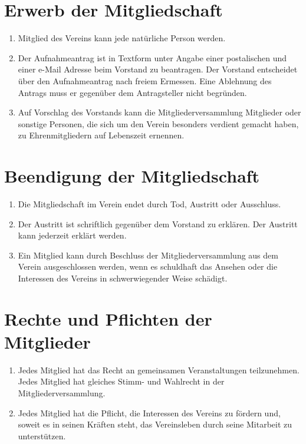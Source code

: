 \section{Erwerb der Mitgliedschaft}
\begin{enumerate}[label=(\arabic*)]
    \item Mitglied des Vereins kann jede natürliche Person werden.
    \item Der Aufnahmeantrag ist in Textform unter Angabe einer postalischen und einer 
        e-Mail Adresse beim Vorstand zu beantragen. Der Vorstand entscheidet über den
        Aufnahmeantrag nach freiem Ermessen. Eine Ablehnung des Antrags muss
        er gegenüber dem Antragsteller nicht begründen.
    \item Auf Vorschlag des Vorstands kann die Mitgliederversammlung Mitglieder
        oder sonstige Personen, die sich um den Verein besonders verdient
        gemacht haben, zu Ehrenmitgliedern auf Lebenszeit ernennen.
\end{enumerate}

\section{Beendigung der Mitgliedschaft}
\begin{enumerate}[label=(\arabic*)]
    \item Die Mitgliedschaft im Verein endet durch Tod, Austritt oder Ausschluss.
    \item Der Austritt ist schriftlich gegenüber dem Vorstand zu erklären. Der
        Austritt kann jederzeit erklärt werden.
    \item Ein Mitglied kann durch Beschluss der Mitgliederversammlung aus dem
        Verein ausgeschlossen werden, wenn es schuldhaft das Ansehen oder die
        Interessen des Vereins in schwerwiegender Weise schädigt.
\end{enumerate}

\section{Rechte und Pflichten der Mitglieder}
\begin{enumerate}[label=(\arabic*)]
    \item Jedes Mitglied hat das Recht an gemeinsamen Veranstaltungen
        teilzunehmen. Jedes Mitglied hat gleiches Stimm- und Wahlrecht in der
        Mitgliederversammlung.
    \item Jedes Mitglied hat die Pflicht, die Interessen des Vereins zu fördern
        und, soweit es in seinen Kräften steht, das Vereinsleben durch seine
        Mitarbeit zu unterstützen.
\end{enumerate}

